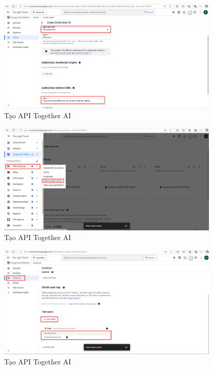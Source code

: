 \begin{itemize}[label=]
\begin{figure}[H]
    \end{figure}
    \begin{figure}[H]
    \centering
    \includegraphics[width=0.95\textwidth]{images/GGcloud-12.png}
    \caption{Tạo API Together AI}
    
    \end{figure}

    \begin{figure}[H]
    \centering
    \includegraphics[width=0.95\textwidth]{images/GGcloud-14.png}
    \caption{Tạo API Together AI}
    
    \end{figure}
    \begin{figure}[H]
    \centering
    \includegraphics[width=0.95\textwidth]{images/GGcloud-15.png}
    \caption{Tạo API Together AI}
    

\end{figure}
\end{itemize}
